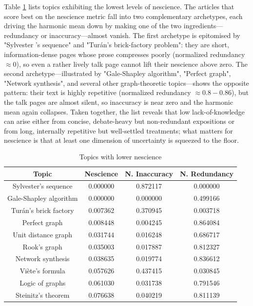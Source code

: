 Table \ref{tab:Lower-nescience-of-topics} lists topics exhibiting the lowest levels of nescience. The articles that score best on the nescience metric fall into two complementary archetypes, each driving the harmonic mean down by making one of the two ingredients—redundancy or inaccuracy—almost vanish.  The first archetype is epitomised by "Sylvester 's sequence" and "Turán's brick-factory problem": they are short, information-dense pages whose prose compresses poorly (normalized redundancy $\approx 0$), so even a rather lively talk page cannot lift their nescience above zero.  The second archetype—illustrated by "Gale-Shapley algorithm", "Perfect graph", "Network synthesis", and several other graph-theoretic topics—shows the opposite pattern: their text is highly repetitive (normalized redundancy $\approx 0.8-0.86$), but the talk pages are almost silent, so inaccuracy is near zero and the harmonic mean again collapses.  Taken together, the list reveals that low lack-of-knowledge can arise either from concise, debate-heavy but non-redundant expositions or from long, internally repetitive but well-settled treatments; what matters for nescience is that at least one dimension of uncertainty is squeezed to the floor.

\begin{table}
\begin{centering}
\begin{tabular}{|c|c|c|c|}
\hline 
Topic & Nescience & N. Inaccuracy & N. Redundancy \tabularnewline
\hline 
\hline
Sylvester's sequence & 0.000000 & 0.872117 & 0.000000 \tabularnewline
\hline
Gale-Shapley algorithm & 0.000000 & 0.000000 & 0.499166 \tabularnewline
\hline
Turán's brick factory & 0.007362 & 0.370945 & 0.003718 \tabularnewline
\hline
Perfect graph & 0.008448 & 0.004245 & 0.864084 \tabularnewline
\hline
Unit distance graph & 0.031744 & 0.016248 & 0.686717 \tabularnewline
\hline
Rook's graph & 0.035003 & 0.017887 & 0.812327 \tabularnewline
\hline
Network synthesis & 0.038635 & 0.019774 & 0.836612 \tabularnewline
\hline
Viète's formula & 0.057626 & 0.437415 & 0.030845 \tabularnewline
\hline
Logic of graphs & 0.061030 & 0.031738 & 0.791546 \tabularnewline
\hline
Steinitz's theorem & 0.076638 & 0.040219 & 0.811139 \tabularnewline
\hline 
\end{tabular}
\par\end{centering}
\caption{\label{tab:Lower-nescience-of-topics}Topics with lower nescience}
\end{table}

